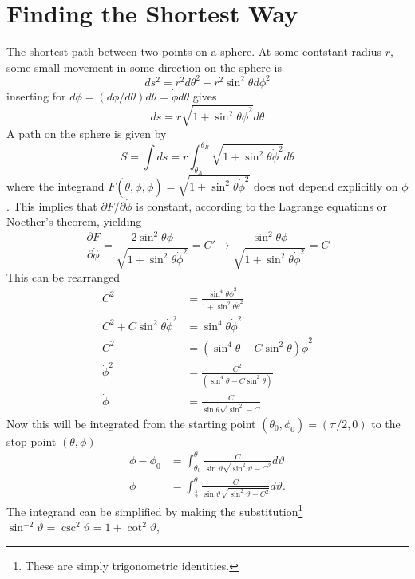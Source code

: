 \documentclass[11pt]{amsart}
\begin{document}
\section{Finding the Shortest Way}
The shortest path between two points on a sphere. At some contstant radius $r$, some small movement in some direction on the sphere is
\begin{equation}
ds^2 = r^2d\theta^2 + r^2\sin^2\theta d\phi^2 
\end{equation}
inserting for $d\phi = (d\phi/d\theta)d\theta = \dot{\phi}d\theta$ gives
\begin{equation}
ds = r\sqrt{1 +\sin^2\theta\dot{\phi}^2}d\theta
\end{equation}
A path on the sphere is given by
\begin{equation}
S = \int ds = r \int_{\theta_A}^{\theta_B} \sqrt{1 + \sin^2\theta\dot{\phi}^2}d\theta
\end{equation}
where the integrand $F(\theta, \phi, \dot{\phi}) = \sqrt{1 + \sin^2\theta\dot{\phi}^2}$ does not depend explicitly on $\phi$. This implies that $\partial F/ \partial \dot{\phi}$ is constant, according to the Lagrange equations or Noether's theorem, yielding
\begin{equation}
\frac{\partial F}{\partial \dot{\phi}} = \frac{2\sin^2\theta\dot{\phi}}{\sqrt{1 + \sin^2\theta\dot{\phi}^2}} = C' \rightarrow \frac{\sin^2\theta\dot{\phi}}{\sqrt{1 + \sin^2\theta\dot{\phi}^2}} = C  
\end{equation}
This can be rearranged
\begin{align*}
C^2 &= \frac{\sin^4\theta\dot{\phi}^2}{1 + \sin^2\theta\dot{\theta}^2} \\
C^2 + C\sin^2\theta\dot{\phi}^2 &= \sin^4\theta\dot{\phi}^2 \\
C^2 &= (\sin^4\theta - C\sin^2\theta)\dot{\phi}^2 \\
\dot{\phi}^2 &= \frac{C^2}{(\sin^4\theta - C\sin^2\theta)} \\
\dot{\phi} &= \frac{C}{\sin\theta\sqrt{\sin^2 - C}}
\end{align*}
Now this will be integrated from the starting point $(\theta_0, \phi_0) = (\pi/2,0)$ to the stop point $(\theta,\phi)$
\begin{align*}
\phi - \phi_0 &= \int_{\theta_0}^{\theta} \frac{C}{\sin\vartheta\sqrt{\sin^2\vartheta-C^2}}d\vartheta \\
\phi &= \int_{\frac{\pi}{2}}^{\theta} \frac{C}{\sin\vartheta\sqrt{\sin^2\vartheta-C^2}}d\vartheta.
\end{align*}
The integrand can be simplified by making the substitution\footnote{These are simply trigonometric identities.} $\sin^{-2}\vartheta = \csc^2\vartheta = 1 + \cot^2\vartheta$,
\end{document}
